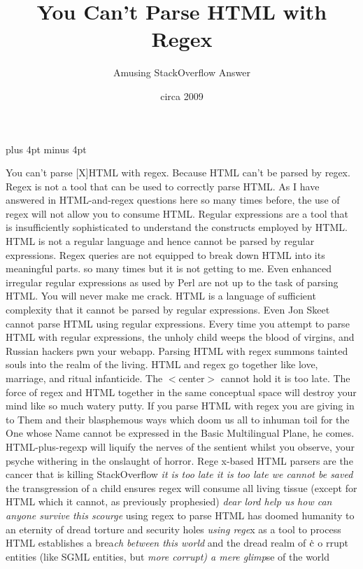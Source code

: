 \documentclass[10pt,letterpaper]{article}
\title{You Can't Parse HTML with Regex}
\author{Amusing StackOverflow Answer}
\date{circa 2009}
\def\rayz#1#2{\llap{\raise #1\hbox{#2}}}%
\def\rayzl#1#2{\llap{\raise #1\hbox{\lil #2}}}%
\begin{document}
\parskip 10pt plus 4pt minus 4pt\parindent=0pt%
\lineskiplimit=-1000pt%
\maketitle

\parskip=0pt
You can't parse [X]HTML with regex. Because HTML can't be parsed by
regex. Regex is not a tool that can be used to correctly parse
HTML\hbox{}. As I have answered in HTML-and-regex questions here so many
times before, the use of regex will not allow you to consume
HTML\hbox{}. Regular expressions are a tool that is insufficiently
sophisticated to understand the constructs employed by HTML\hbox{}. HTML is
not a regular language and hence cannot be parsed by regular
expressions. Regex queries are not equipped to break down HTML into
its meaningful parts. so many times but it is not getting to me. Even
enhanced irregular regular expressions as used by Perl are not up to
the task of parsing HTML\hbox{}. You will never make me crack. HTML is a
language of sufficient complexity that it cannot be parsed by regular
expressions. Even Jon Skeet cannot parse HTML using regular
expressions. Every time you attempt to parse HTML with regular
expressions, the unholy child weeps the blood of virgins, and Russian
hackers pwn your webapp. Parsing HTML with regex summons tainted souls
into the realm of the living. HTML and regex go together like love,
marriage, and ritual infanticide. The $<$center$>$ cannot hold it is too
late. The force of regex and HTML together in the same conceptual
space will destroy your mind like so much watery putty. If you parse
HTML with regex you are giving in to Them and their blasphemous ways
which doom us all to inhuman toil for the One whose Name cannot be
expressed in the Basic Multilingual Plane, he comes. HTML-plus-regexp
will liquify the nerves of the sentient whilst you observe, your
psyche withering in the onslaught of horror.
Rege\rayz{0pt}{$\bar{\phantom{e}}$}%
\rayz{1pt}{$\bar{\phantom{e}}$}%
\rayz{2pt}{$\grave{\phantom{e}}$}%
\rayz{3pt}{$\acute{\phantom{e}}$}x-based
HTML parsers are the cancer that is killing StackOverflow
{\it it is too late it is too
late we cannot be saved} the transgression of a
chil\rayz{6.5pt}{$\frown$}d
ensures regex
will consume all living tissue (except for HTML which it cannot, as
previously prophesied)
{\it dear lord help us how can anyone survive this
scourge} using regex to parse HTML has doomed humanity to an eternity
of dread torture and security holes {\it using rege}x as a tool to process
HTML establishes a brea{\it ch between this world} and the dread realm of
$\dot{\rm c}$\rayz{1pt}{$\hat{\phantom{c}}$}\rayzl{8pt}{h}%
o\rayz{-1pt}{$^{{}^\varsigma}$}\rayzl{8pt}{m}%
rrupt
entities (like SGML entities, but
{\it more corrupt) a mere glimp}se of the world
\end{document}
